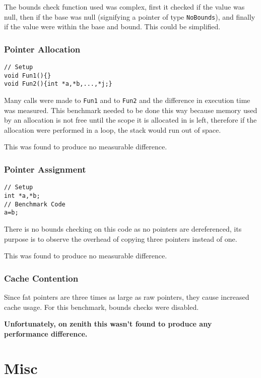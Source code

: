 The bounds check function used was complex, first it checked if the value was null, then if the base was null (signifying a pointer of type \verb!NoBounds!), and finally if the value were within the base and bound.
This could be simplified.

\subsubsection{Pointer Allocation}

\begin{verbatim}
// Setup
void Fun1(){}
void Fun2(){int *a,*b,...,*j;}
\end{verbatim}

Many calls were made to \verb!Fun1! and to \verb!Fun2! and the difference in execution time was measured.
This benchmark needed to be done this way because memory used by an allocation is not free until the scope it is allocated in is left, therefore if the allocation were performed in a loop, the stack would run out of space.

This was found to produce no measurable difference.

\subsubsection{Pointer Assignment}

\begin{verbatim}
// Setup
int *a,*b;
// Benchmark Code
a=b;
\end{verbatim}

There is no bounds checking on this code as no pointers are dereferenced, its purpose is to observe the overhead of copying three pointers instead of one.

This was found to produce no measurable difference.

\subsubsection{Cache Contention}

Since fat pointers are three times as large as raw pointers, they cause increased cache usage.
For this benchmark, bounds checks were disabled.

\textbf{Unfortunately, on zenith this wasn't found to produce any performance difference.}

\section{Misc}
